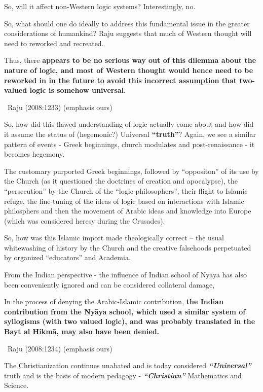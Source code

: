 So, will it affect non-Western logic systems? Interestingly, no.

So, what should one do ideally to address this fundamental issue in the greater considerations of humankind? Raju suggests that much of Western thought will need to reworked and recreated.

\begin{myquote}
Thus, there \textbf{appears to be no serious way out of this dilemma about the nature of logic, and most of Western thought would hence need to be reworked in in the future to avoid this incorrect assumption that two-valued logic is somehow universal.}

~\hfill Raju (2008:1233) (emphasis ours)
\end{myquote}

So, how did this flawed understanding of logic actually come about and how did it assume the status of (hegemonic?) Universal \textbf{“truth”}? Again, we see a similar pattern of events - Greek beginnings, church modulates and post-renaissance - it becomes hegemony.

The customary purported Greek beginnings, followed by “oppositon” of its use by the Church (as it questioned the doctrines of creation and apocalypse), the “persecution” by the Church of the “logic philosophers”, their flight to Islamic refuge, the fine-tuning of the ideas of logic based on interactions with Islamic philosphers and then the movement of Arabic ideas and knowledge into Europe (which was considered heresy during the Crusades).

\newpage

So, how was this Islamic import made theologically correct – the usual whitewashing of history by the Church and the creative falsehoods perpetuated by organized “educators” and Academia.

From the Indian perspective - the influence of Indian school of Nyāya has also been conveniently ignored and can be considered collateral damage,

\begin{myquote}
In the process of denying the Arabic-Islamic contribution, \textbf{the Indian contribution from the Nyāya school, which used a similar system of syllogisms (with two valued logic), and was probably translated in the Bayt al Hikmā, may also have been denied.}

~\hfill Raju (2008:1234) (emphasis ours)
\end{myquote}

The Christianization continues unabated and is today considered \textbf{\textit{“Universal”}} truth and is the basis of modern pedagogy - \textbf{\textit{“Christian”}} Mathematics and Science.


